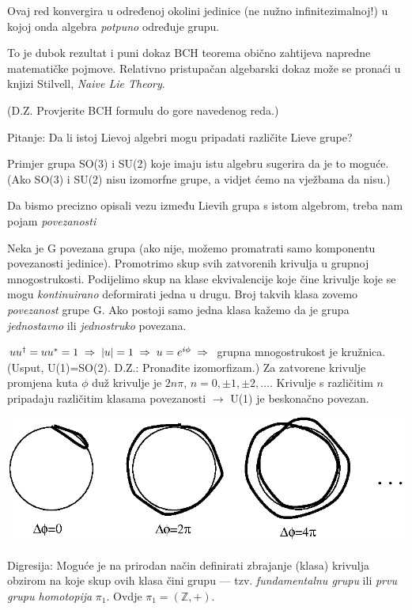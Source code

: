Ovaj red konvergira u određenoj okolini jedinice (ne nužno infinitezimalnoj!)
u kojoj onda algebra \emph{potpuno} određuje grupu.

To je dubok rezultat i puni dokaz BCH teorema obično zahtijeva napredne matematičke
pojmove. Relativno pristupačan algebarski dokaz može se pronaći u knjizi
Stilvell, \emph{Naive Lie Theory}.

(D.Z. Provjerite BCH formulu do gore navedenog reda.)

Pitanje: Da li istoj Lievoj algebri mogu pripadati različite Lieve grupe?

Primjer grupa SO(3) i SU(2) koje imaju istu algebru sugerira da je to moguće. 
(Ako SO(3) i SU(2) nisu izomorfne grupe, a vidjet ćemo na vježbama da nisu.)

Da bismo precizno opisali vezu između Lievih grupa s istom algebrom, treba
nam pojam \emph{povezanosti}

\begin{definicija}[Povezanost]
  Neka je G povezana grupa (ako nije, možemo promatrati samo komponentu
povezanosti jedinice). Promotrimo skup svih zatvorenih krivulja u grupnoj 
mnogostrukosti. Podijelimo skup  na klase ekvivalencije koje čine 
krivulje koje se mogu \emph{kontinuirano} deformirati jedna u drugu.
Broj takvih klasa zovemo \emph{povezanost} grupe G. Ako postoji samo
jedna klasa kažemo da je grupa \emph{jednostavno} ili \emph{jednostruko}
povezana.
\end{definicija}

\begin{primjer}[U(1)]
$u u^\dagger = u u^* = 1 \;\Rightarrow\; |u|=1 \;\Rightarrow\; u=e^{i\phi} \;\Rightarrow\;$ grupna
mnogostrukost je kružnica.
(Usput, U(1)=SO(2). D.Z.: Pronađite izomorfizam.)
Za zatvorene krivulje promjena kuta $\phi$ duž krivulje je $2n\pi$,
$n=0,\pm 1, \pm 2, \ldots$. Krivulje s različitim $n$ pripadaju
različitim klasama povezanosti $\to$ U(1) je beskonačno povezan.

\centerline{\includegraphics[scale=1.0]{pics/homotopija.eps}}

Digresija: Moguće je na prirodan način definirati zbrajanje (klasa) krivulja 
obzirom na koje skup ovih klasa čini grupu --- tzv. \emph{fundamentalnu
grupu} ili \emph{prvu grupu homotopija} $\pi_1$. Ovdje $\pi_1=(\mathbb{Z}, +)$.

\end{primjer}

